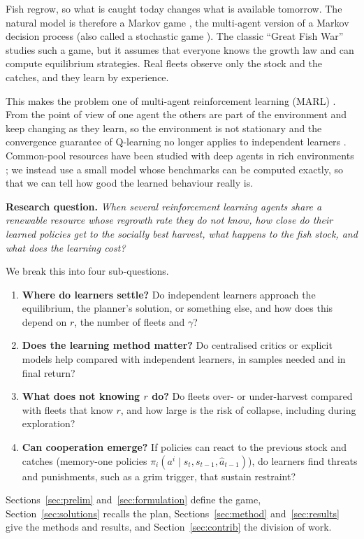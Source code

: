 \documentclass{article}
\begin{document}
Fish regrow, so what is caught today changes what is available tomorrow. The natural model is therefore a Markov game \cite{littman1994}, the multi-agent version of a Markov decision process (also called a stochastic game \cite{shapley1953}). The classic ``Great Fish War'' \cite{levhari1980} studies such a game, but it assumes that everyone knows the growth law and can compute equilibrium strategies. Real fleets observe only the stock and the catches, and they learn by experience.

This makes the problem one of multi-agent reinforcement learning (MARL) \cite{zhang2021}. From the point of view of one agent the others are part of the environment and keep changing as they learn, so the environment is not stationary and the convergence guarantee of Q-learning \cite{watkins1992} no longer applies to independent learners \cite{tan1993}. Common-pool resources have been studied with deep agents in rich environments \cite{leibo2017,perolat2017}; we instead use a small model whose benchmarks can be computed exactly, so that we can tell how good the learned behaviour really is.

\medskip
\noindent\textbf{Research question.} \textit{When several reinforcement learning agents share a renewable resource whose regrowth rate they do not know, how close do their learned policies get to the socially best harvest, what happens to the fish stock, and what does the learning cost?}
\medskip

We break this into four sub-questions.
\begin{enumerate}
\item \textbf{Where do learners settle?} Do independent learners approach the equilibrium, the planner's solution, or something else, and how does this depend on $r$, the number of fleets and $\gamma$?
\item \textbf{Does the learning method matter?} Do centralised critics or explicit models help compared with independent learners, in samples needed and in final return?
\item \textbf{What does not knowing $r$ do?} Do fleets over- or under-harvest compared with fleets that know $r$, and how large is the risk of collapse, including during exploration?
\item \textbf{Can cooperation emerge?} If policies can react to the previous stock and catches (memory-one policies $\pi_i(a^i\mid s_t,s_{t-1},\hat a_{t-1})$), do learners find threats and punishments, such as a grim trigger, that sustain restraint?
\end{enumerate}
Sections~\ref{sec:prelim} and~\ref{sec:formulation} define the game, Section~\ref{sec:solutions} recalls the plan, Sections~\ref{sec:method} and~\ref{sec:results} give the methods and results, and Section~\ref{sec:contrib} the division of work.
\end{document}
